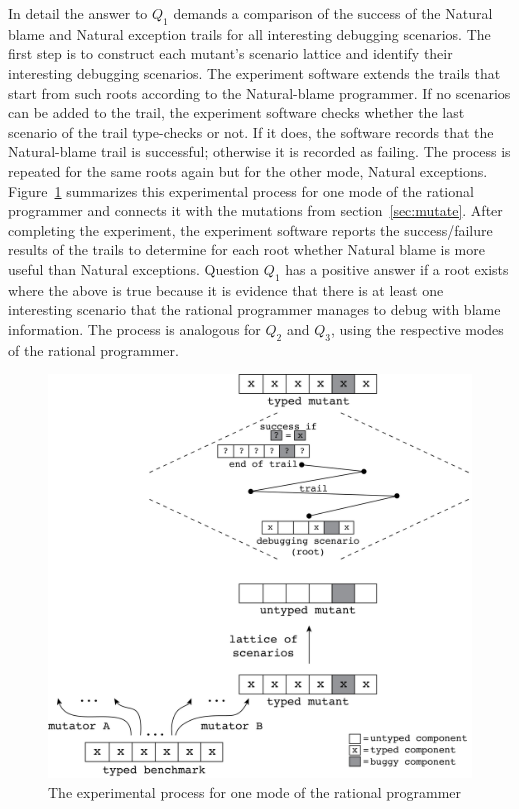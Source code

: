 
In detail the answer to $Q_1$ demands a comparison of the success of the Natural
blame and Natural exception trails for all interesting debugging scenarios.  The
first step is to construct each mutant's scenario lattice and identify their
interesting debugging scenarios.  The experiment software extends the trails that start
from such roots according to the Natural-blame programmer.  If no scenarios can
be added to the trail, the experiment software checks whether the last scenario
of the trail type-checks or not. If it does, the software records that the
Natural-blame trail is successful; otherwise it is recorded as failing. The
process is repeated for the same roots again but for the other mode, Natural
exceptions.  Figure~\ref{fig:process} summarizes this experimental process for
one mode of the rational programmer and connects it with the mutations from
section~\ref{sec:mutate}.  After completing the experiment, the experiment
software reports the success/failure results of the trails to determine for each
root whether Natural blame is more useful than Natural exceptions.  Question
$Q_1$ has a positive answer if a root exists where the above is true because it
is evidence that there is at least one interesting scenario that the rational
programmer manages to debug with blame information.  The process is analogous
for $Q_2$ and $Q_3$, using the respective modes of the rational programmer.

\begin{figure}[bh]
  \centering
  \includegraphics[scale=0.36]{./Images/process}
  \caption{The experimental process for one mode of the rational
  programmer}
  \label{fig:process}
\end{figure}


